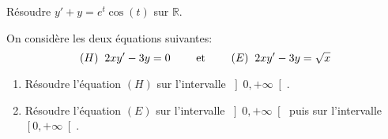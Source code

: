 \documentclass[a4paper,twoside,french,11pt]{VcCours}
\begin{document}
\begin{Exercice}{} Résoudre $y'+y = e^t \cos(t)$ sur $\mathbb{R}$.
\end{Exercice}


\begin{Exercice}{} On considère les deux équations suivantes:
$$ (H) \; \;  2xy'-3y=0  \qquad \hbox{ et } \qquad (E) \; \; 2xy'-3y=\sqrt{x} $$
\begin{enumerate}
\item Résoudre l'équation $(H)$ sur l'intervalle $\left]  0,+\infty\right[ $.
\item Résoudre l'équation $(E)$ sur l'intervalle $\left]  0,+\infty\right[   $ puis sur l'intervalle $\left[ 0,+\infty\right[ $.
\end{enumerate}
\end{Exercice}
\end{document}
